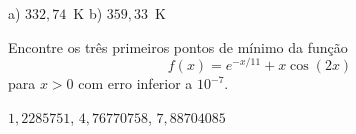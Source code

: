 \begin{resp}

 a) $332,74$~K b) $359,33$~K

\end{resp}

\begin{exer} Encontre os três primeiros pontos de mínimo da função \begin{equation} f(x)=e^{-x/11}+x\cos(2x) \end{equation} para $x>0$ com erro inferior a $10^{-7}$.
\end{exer}
\begin{resp}

$1,2285751$, $4,76770758$, $7,88704085$

\end{resp}

%
